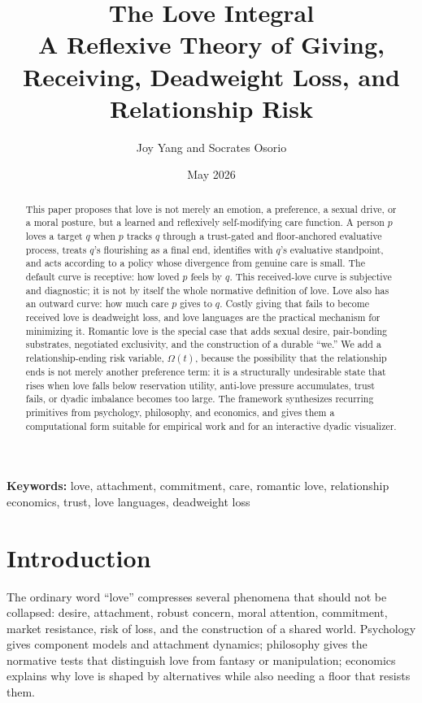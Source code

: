 \documentclass[11pt]{article}
\title{\textbf{The Love Integral}\\
\large A Reflexive Theory of Giving, Receiving, Deadweight Loss, and Relationship Risk}
\author{Joy Yang and Socrates Osorio}
\date{May 2026}
\newcommand{\Risk}{\Omega}
\begin{document}
\maketitle

\begin{abstract}
This paper proposes that love is not merely an emotion, a preference, a sexual drive, or a moral posture, but a learned and reflexively self-modifying care function. A person $p$ loves a target $q$ when $p$ tracks $q$ through a trust-gated and floor-anchored evaluative process, treats $q$'s flourishing as a final end, identifies with $q$'s evaluative standpoint, and acts according to a policy whose divergence from genuine care is small. The default curve is receptive: how loved $p$ feels by $q$. This received-love curve is subjective and diagnostic; it is not by itself the whole normative definition of love. Love also has an outward curve: how much care $p$ gives to $q$. Costly giving that fails to become received love is deadweight loss, and love languages are the practical mechanism for minimizing it. Romantic love is the special case that adds sexual desire, pair-bonding substrates, negotiated exclusivity, and the construction of a durable ``we.'' We add a relationship-ending risk variable, $\Risk(t)$, because the possibility that the relationship ends is not merely another preference term: it is a structurally undesirable state that rises when love falls below reservation utility, anti-love pressure accumulates, trust fails, or dyadic imbalance becomes too large. The framework synthesizes recurring primitives from psychology, philosophy, and economics, and gives them a computational form suitable for empirical work and for an interactive dyadic visualizer.
\end{abstract}

\noindent\textbf{Keywords:} love, attachment, commitment, care, romantic love, relationship economics, trust, love languages, deadweight loss

\section{Introduction}
The ordinary word ``love'' compresses several phenomena that should not be collapsed: desire, attachment, robust concern, moral attention, commitment, market resistance, risk of loss, and the construction of a shared world. Psychology gives component models and attachment dynamics; philosophy gives the normative tests that distinguish love from fantasy or manipulation; economics explains why love is shaped by alternatives while also needing a floor that resists them.
\end{document}
